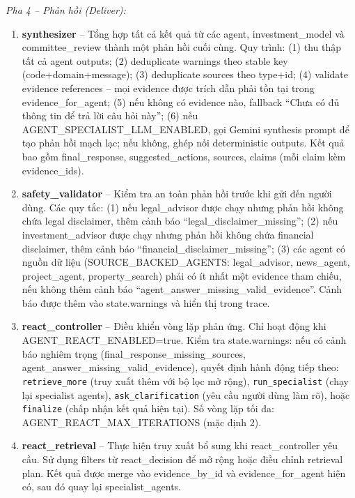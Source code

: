 \textit{Pha 4 -- Phản hồi (Deliver):}

\begin{enumerate}[leftmargin=4em]
    \item[10.] \textbf{synthesizer} -- Tổng hợp tất cả kết quả từ các agent, investment\_model và committee\_review thành một phản hồi cuối cùng. Quy trình: (1) thu thập tất cả agent outputs; (2) deduplicate warnings theo stable key (code+domain+message); (3) deduplicate sources theo type+id; (4) validate evidence references -- mọi evidence được trích dẫn phải tồn tại trong evidence\_for\_agent; (5) nếu không có evidence nào, fallback ``Chưa có đủ thông tin để trả lời câu hỏi này''; (6) nếu AGENT\_SPECIALIST\_LLM\_ENABLED, gọi Gemini synthesis prompt để tạo phản hồi mạch lạc; nếu không, ghép nối deterministic outputs. Kết quả bao gồm final\_response, suggested\_actions, sources, claims (mỗi claim kèm evidence\_ids).

    \item[11.] \textbf{safety\_validator} -- Kiểm tra an toàn phản hồi trước khi gửi đến người dùng. Các quy tắc: (1) nếu legal\_advisor được chạy nhưng phản hồi không chứa legal disclaimer, thêm cảnh báo ``legal\_disclaimer\_missing''; (2) nếu investment\_advisor được chạy nhưng phản hồi không chứa financial disclaimer, thêm cảnh báo ``financial\_disclaimer\_missing''; (3) các agent có nguồn dữ liệu (SOURCE\_BACKED\_AGENTS: legal\_advisor, news\_agent, project\_agent, property\_search) phải có ít nhất một evidence tham chiếu, nếu không thêm cảnh báo ``agent\_answer\_missing\_valid\_evidence''. Cảnh báo được thêm vào state.warnings và hiển thị trong trace.

    \item[12.] \textbf{react\_controller} -- Điều khiển vòng lặp phản ứng. Chỉ hoạt động khi AGENT\_REACT\_ENABLED=true. Kiểm tra state.warnings: nếu có cảnh báo nghiêm trọng (final\_response\_missing\_sources, agent\_answer\_missing\_valid\_evidence), quyết định hành động tiếp theo: \texttt{retrieve\_more} (truy xuất thêm với bộ lọc mở rộng), \texttt{run\_specialist} (chạy lại specialist agents), \texttt{ask\_clarification} (yêu cầu người dùng làm rõ), hoặc \texttt{finalize} (chấp nhận kết quả hiện tại). Số vòng lặp tối đa: AGENT\_REACT\_MAX\_ITERATIONS (mặc định 2).

    \item[13.] \textbf{react\_retrieval} -- Thực hiện truy xuất bổ sung khi react\_controller yêu cầu. Sử dụng filters từ react\_decision để mở rộng hoặc điều chỉnh retrieval plan. Kết quả được merge vào evidence\_by\_id và evidence\_for\_agent hiện có, sau đó quay lại specialist\_agents.


\end{enumerate}
